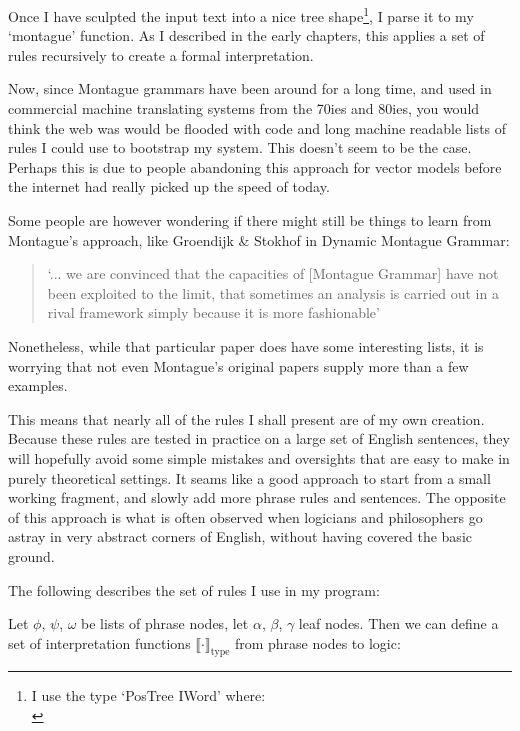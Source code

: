 \documentclass[12pt]{article}
\begin{document}
Once I have sculpted the input text into a nice tree shape\footnote{I use the type `PosTree IWord' where:\\
\usebox{\LstBox}}, I parse it to my `montague' function. As I described in the early chapters, this applies a set of rules recursively to create a formal interpretation.

Now, since Montague grammars have been around for a long time, and used in commercial machine translating systems from the 70ies and 80ies, you would think the web was would be flooded with code and long machine readable lists of rules I could use to bootstrap my system. This doesn't seem to be the case. Perhaps this is due to people abandoning this approach for vector models before the internet had really picked up the speed of today.

Some people are however wondering if there might still be things to learn from Montague's approach, like Groendijk \& Stokhof in Dynamic Montague Grammar\cite{groenendijk1990dynamic}:
\begin{quotation}
`... we are convinced that the capacities of [Montague Grammar] have not been exploited to the limit, that sometimes an analysis is carried out in a rival framework simply because it is more fashionable'
\end{quotation}

Nonetheless, while that particular paper does have some interesting lists, it is worrying that not even Montague's original papers supply more than a few examples.

This means that nearly all of the rules I shall present are of my own creation. Because these rules are tested in practice on a large set of English sentences, they will hopefully avoid some simple mistakes and oversights that are easy to make in purely theoretical settings. It seams like a good approach to start from a small working fragment, and slowly add more phrase rules and sentences. The opposite of this approach is what is often observed when logicians and philosophers go astray in very abstract corners of English, without having covered the basic ground.

The following describes the set of rules I use in my program:

Let $\phi$, $\psi$, $\omega$ be lists of phrase nodes, let $\alpha$, $\beta$, $\gamma$ leaf nodes.
Then we can define a set of interpretation functions $\llbracket\cdot\rrbracket_\text{type}$ from phrase nodes to logic:
\end{document}
